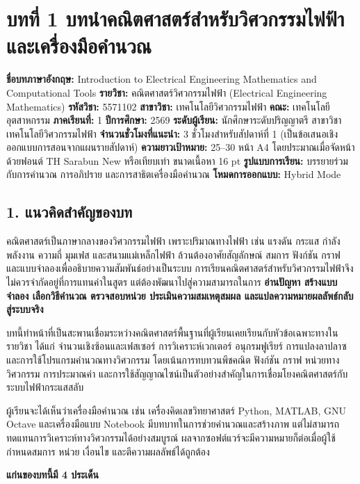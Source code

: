 \section{บทที่ 1 บทนำคณิตศาสตร์สำหรับวิศวกรรมไฟฟ้าและเครื่องมือคำนวณ}

\textbf{ชื่อบทภาษาอังกฤษ:} Introduction to Electrical Engineering Mathematics and Computational Tools
\textbf{รายวิชา:} คณิตศาสตร์วิศวกรรมไฟฟ้า (Electrical Engineering Mathematics)
\textbf{รหัสวิชา:} 5571102
\textbf{สาขาวิชา:} เทคโนโลยีวิศวกรรมไฟฟ้า
\textbf{คณะ:} เทคโนโลยีอุตสาหกรรม
\textbf{ภาคเรียนที่:} 1
\textbf{ปีการศึกษา:} 2569
\textbf{ระดับผู้เรียน:} นักศึกษาระดับปริญญาตรี สาขาวิชาเทคโนโลยีวิศวกรรมไฟฟ้า
\textbf{จำนวนชั่วโมงที่แนะนำ:} 3 ชั่วโมงสำหรับสัปดาห์ที่ 1 (เป็นข้อเสนอเชิงออกแบบการสอนจากแผนรายสัปดาห์)
\textbf{ความยาวเป้าหมาย:} 25–30 หน้า A4 โดยประมาณเมื่อจัดหน้าด้วยฟอนต์ TH Sarabun New หรือเทียบเท่า ขนาดเนื้อหา 16 pt
\textbf{รูปแบบการเรียน:} บรรยายร่วมกับการคำนวณ การอภิปราย และการสาธิตเครื่องมือคำนวณ
\textbf{โหมดการออกแบบ:} Hybrid Mode



\subsection{1. แนวคิดสำคัญของบท}

คณิตศาสตร์เป็นภาษากลางของวิศวกรรมไฟฟ้า เพราะปริมาณทางไฟฟ้า เช่น แรงดัน กระแส กำลัง พลังงาน ความถี่ มุมเฟส และสนามแม่เหล็กไฟฟ้า ล้วนต้องอาศัยสัญลักษณ์ สมการ ฟังก์ชัน กราฟ และแบบจำลองเพื่ออธิบายความสัมพันธ์อย่างเป็นระบบ การเรียนคณิตศาสตร์สำหรับวิศวกรรมไฟฟ้าจึงไม่ควรจำกัดอยู่ที่การแทนค่าในสูตร แต่ต้องพัฒนาไปสู่ความสามารถในการ \textbf{อ่านปัญหา สร้างแบบจำลอง เลือกวิธีคำนวณ ตรวจสอบหน่วย ประเมินความสมเหตุสมผล และแปลความหมายผลลัพธ์กลับสู่ระบบจริง}

บทนี้ทำหน้าที่เป็นสะพานเชื่อมระหว่างคณิตศาสตร์พื้นฐานที่ผู้เรียนเคยเรียนกับหัวข้อเฉพาะทางในรายวิชา ได้แก่ จำนวนเชิงซ้อนและเฟสเซอร์ การวิเคราะห์เวกเตอร์ อนุกรมฟูเรียร์ การแปลงลาปลาซ และการใช้โปรแกรมคำนวณทางวิศวกรรม โดยเน้นการทบทวนพีชคณิต ฟังก์ชัน กราฟ หน่วยทางวิศวกรรม การประมาณค่า และการใช้สัญญาณไซน์เป็นตัวอย่างสำคัญในการเชื่อมโยงคณิตศาสตร์กับระบบไฟฟ้ากระแสสลับ

ผู้เรียนจะได้เห็นว่าเครื่องมือคำนวณ เช่น เครื่องคิดเลขวิทยาศาสตร์ Python, MATLAB, GNU Octave และเครื่องมือแบบ Notebook มีบทบาทในการช่วยคำนวณและสร้างภาพ แต่ไม่สามารถทดแทนการวิเคราะห์ทางวิศวกรรมได้อย่างสมบูรณ์ ผลจากซอฟต์แวร์จะมีความหมายก็ต่อเมื่อผู้ใช้กำหนดสมการ หน่วย เงื่อนไข และตีความผลลัพธ์ได้ถูกต้อง

\textbf{แก่นของบทนี้มี 4 ประเด็น}

